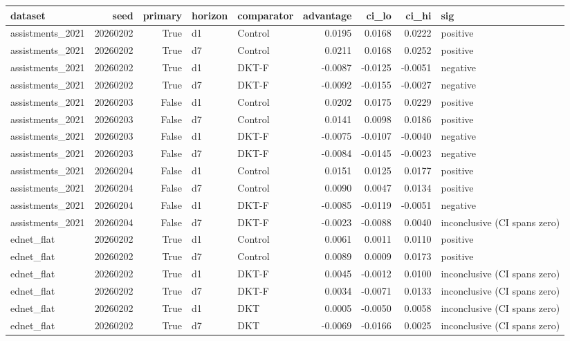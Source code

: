 \begin{tabular}{lrrllrrrl}
\toprule
dataset & seed & primary & horizon & comparator & advantage & ci\_lo & ci\_hi & sig \\
\midrule
assistments\_2021 & 20260202 & True & d1 & Control & 0.0195 & 0.0168 & 0.0222 & positive \\
assistments\_2021 & 20260202 & True & d7 & Control & 0.0211 & 0.0168 & 0.0252 & positive \\
assistments\_2021 & 20260202 & True & d1 & DKT-F & -0.0087 & -0.0125 & -0.0051 & negative \\
assistments\_2021 & 20260202 & True & d7 & DKT-F & -0.0092 & -0.0155 & -0.0027 & negative \\
assistments\_2021 & 20260203 & False & d1 & Control & 0.0202 & 0.0175 & 0.0229 & positive \\
assistments\_2021 & 20260203 & False & d7 & Control & 0.0141 & 0.0098 & 0.0186 & positive \\
assistments\_2021 & 20260203 & False & d1 & DKT-F & -0.0075 & -0.0107 & -0.0040 & negative \\
assistments\_2021 & 20260203 & False & d7 & DKT-F & -0.0084 & -0.0145 & -0.0023 & negative \\
assistments\_2021 & 20260204 & False & d1 & Control & 0.0151 & 0.0125 & 0.0177 & positive \\
assistments\_2021 & 20260204 & False & d7 & Control & 0.0090 & 0.0047 & 0.0134 & positive \\
assistments\_2021 & 20260204 & False & d1 & DKT-F & -0.0085 & -0.0119 & -0.0051 & negative \\
assistments\_2021 & 20260204 & False & d7 & DKT-F & -0.0023 & -0.0088 & 0.0040 & inconclusive (CI spans zero) \\
ednet\_flat & 20260202 & True & d1 & Control & 0.0061 & 0.0011 & 0.0110 & positive \\
ednet\_flat & 20260202 & True & d7 & Control & 0.0089 & 0.0009 & 0.0173 & positive \\
ednet\_flat & 20260202 & True & d1 & DKT-F & 0.0045 & -0.0012 & 0.0100 & inconclusive (CI spans zero) \\
ednet\_flat & 20260202 & True & d7 & DKT-F & 0.0034 & -0.0071 & 0.0133 & inconclusive (CI spans zero) \\
ednet\_flat & 20260202 & True & d1 & DKT & 0.0005 & -0.0050 & 0.0058 & inconclusive (CI spans zero) \\
ednet\_flat & 20260202 & True & d7 & DKT & -0.0069 & -0.0166 & 0.0025 & inconclusive (CI spans zero) \\

\end{tabular}
